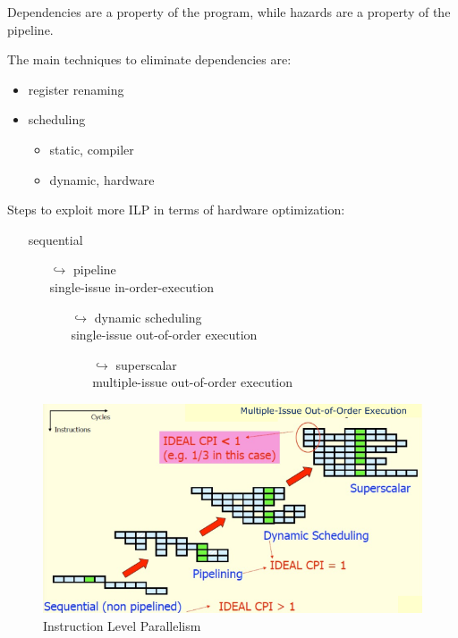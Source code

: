 Dependencies are a property of the program, while
hazards are a property of the pipeline.


The main techniques to eliminate dependencies are:
\begin{itemize}
    \item register renaming
    \item scheduling
    \begin{itemize}
        \item static, compiler
        \item dynamic, hardware
    \end{itemize}
\end{itemize}

Steps to exploit more ILP in terms of hardware optimization:
\begin{itemize}
    \item[\textrightarrow] sequential
    \begin{itemize}
        \item[$\hookrightarrow$] pipeline\\ single-issue in-order-execution
        \begin{itemize}
            \item[$\hookrightarrow$] dynamic scheduling\\ single-issue out-of-order execution
            \begin{itemize}
                \item[$\hookrightarrow$] superscalar\\ multiple-issue out-of-order execution
            \end{itemize}
        \end{itemize}
    \end{itemize}
\end{itemize}

\begin{figure}
    \centering
    \includegraphics[scale = 0.4]{images/ILP-scheme}
    \caption{Instruction Level Parallelism}
    \label{fig:ILP-scheme}
\end{figure}
